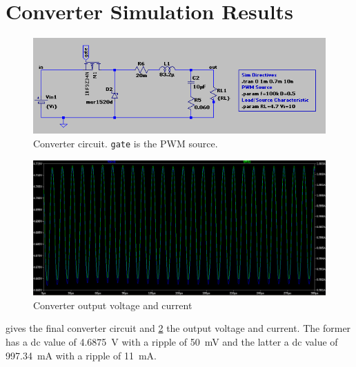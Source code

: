 \section{Converter Simulation Results}



\begin{figure}
	\centering
	\includegraphics[width=\linewidth]{img/ConverterCircuit}
	\caption{Converter circuit. \texttt{gate} is the PWM source.}
	\label{fig:convertercircuit}
\end{figure}
\begin{figure}
	\centering
	\includegraphics[width=\linewidth]{img/ConverterSimulationResults}
	\caption{Converter output voltage and current}
	\label{fig:convertersimulationresults}
\end{figure}

 gives the final converter circuit and \cref{fig:convertersimulationresults} the output voltage and current. The former has a dc value of \SI{4.6875}{\volt} with a ripple of \SI{50}{\milli\volt} and the latter a dc value of \SI{997.34}{\milli\ampere} with a ripple of \SI{11}{\milli\ampere}.

